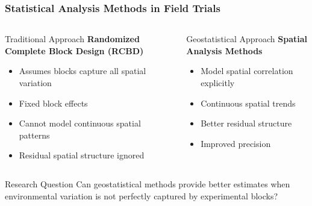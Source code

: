 \documentclass[aspectratio=43]{beamer}
\begin{document}
\begin{frame}
    \frametitle{Statistical Analysis Methods in Field Trials}
    
    \begin{columns}[T]
        \begin{column}{0.5\textwidth}
            \begin{block}{Traditional Approach}
                \textbf{Randomized Complete Block Design (RCBD)}
                \begin{itemize}
                    \item Assumes blocks capture all spatial variation
                    \item Fixed block effects
                    \item Cannot model continuous spatial patterns
                    \item Residual spatial structure ignored
                \end{itemize}
            \end{block}
        \end{column}
        
        \begin{column}{0.5\textwidth}
            \begin{block}{Geostatistical Approach}
                \textbf{Spatial Analysis Methods}
                \begin{itemize}
                    \item Model spatial correlation explicitly
                    \item Continuous spatial trends
                    \item Better residual structure
                    \item Improved precision
                \end{itemize}
            \end{block}
        \end{column}
    \end{columns}
    
    \vspace{1em}
    
    \begin{alertblock}{Research Question}
        Can geostatistical methods provide better estimates when environmental variation is not perfectly captured by experimental blocks?
    \end{alertblock}
\end{frame}
\end{document}
